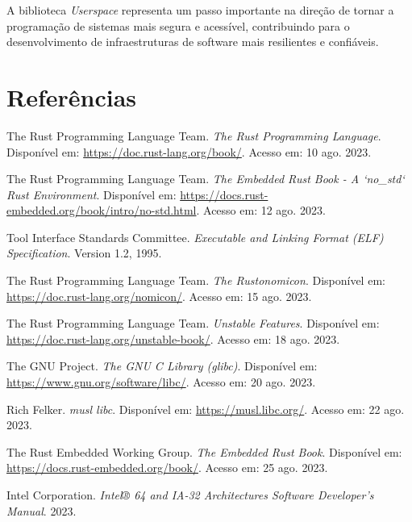 \documentclass[12pt,a4paper]{article}
\begin{document}
A biblioteca \textit{Userspace} representa um passo importante na direção de tornar a programação de sistemas mais segura e acessível, contribuindo para o desenvolvimento de infraestruturas de software mais resilientes e confiáveis.

\section{Referências}

\begin{thebibliography}{99}
 The Rust Programming Language Team. \textit{The Rust Programming Language}. Disponível em: \url{https://doc.rust-lang.org/book/}. Acesso em: 10 ago. 2023.

 The Rust Programming Language Team. \textit{The Embedded Rust Book - A `no\_std` Rust Environment}. Disponível em: \url{https://docs.rust-embedded.org/book/intro/no-std.html}. Acesso em: 12 ago. 2023.

 Tool Interface Standards Committee. \textit{Executable and Linking Format (ELF) Specification}. Version 1.2, 1995.

 The Rust Programming Language Team. \textit{The Rustonomicon}. Disponível em: \url{https://doc.rust-lang.org/nomicon/}. Acesso em: 15 ago. 2023.

 The Rust Programming Language Team. \textit{Unstable Features}. Disponível em: \url{https://doc.rust-lang.org/unstable-book/}. Acesso em: 18 ago. 2023.

 The GNU Project. \textit{The GNU C Library (glibc)}. Disponível em: \url{https://www.gnu.org/software/libc/}. Acesso em: 20 ago. 2023.

 Rich Felker. \textit{musl libc}. Disponível em: \url{https://musl.libc.org/}. Acesso em: 22 ago. 2023.

 The Rust Embedded Working Group. \textit{The Embedded Rust Book}. Disponível em: \url{https://docs.rust-embedded.org/book/}. Acesso em: 25 ago. 2023.

 Intel Corporation. \textit{Intel® 64 and IA-32 Architectures Software Developer's Manual}. 2023.
\end{thebibliography}
\end{document}

